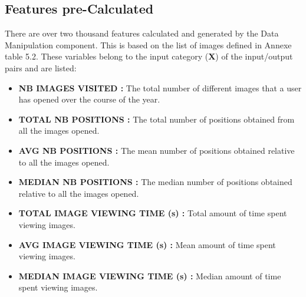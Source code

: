 \documentclass[a4paper,11pt]{report}
\numberwithin{figure}{chapter} %
\begin{document}
\subsection{Features pre-Calculated} \label{section:features}

    There are over two thousand features calculated and generated by the Data Manipulation component.
    This is based on the list of images  defined in Annexe table 5.2.
    These variables belong to the input category (\textbf{X}) of the  input/output pairs and are listed:

   \begin{itemize}
    \item[\textbullet] \textbf{NB IMAGES VISITED :} The total number of different images that a user has opened over the course of the year.\\
    \item[\textbullet] \textbf{TOTAL NB POSITIONS :} The total number of positions obtained from all the images opened.\\
    \item[\textbullet] \textbf{AVG NB POSITIONS :} The mean number of positions obtained relative to all the images opened.\\

    \item[\textbullet] \textbf{MEDIAN NB POSITIONS :} The median number of positions  obtained relative to all the images opened.\\
    \item[\textbullet] \textbf{TOTAL IMAGE VIEWING TIME (s) :} Total amount of time spent viewing images.\\

    \item[\textbullet] \textbf{AVG IMAGE VIEWING TIME (s) :} Mean amount of time spent viewing images.\\

    \item[\textbullet] \textbf{MEDIAN IMAGE VIEWING TIME (s) :} Median amount of time spent viewing images.\\


\end{itemize}
\end{document}
